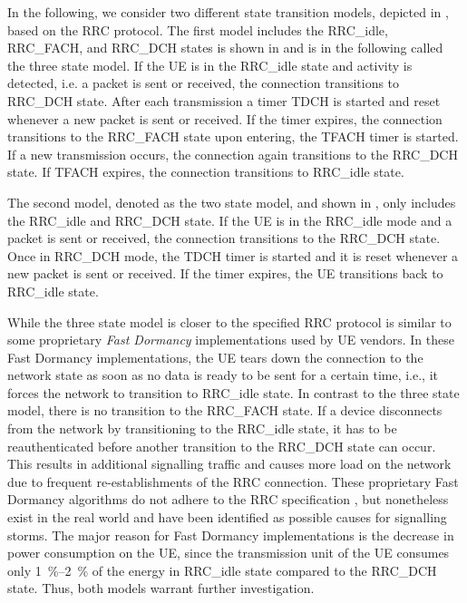 In the following, we consider two different state transition models, depicted in , based on the \gls{RRC} protocol.
The first model includes the \gls{RRC_idle}, \gls{RRC_FACH}, and \gls{RRC_DCH} states is shown in  and is in the following called the three state model.
If the \gls{UE} is in the \gls{RRC_idle} state and activity is detected, i.e. a packet is sent or received, the connection transitions to \gls{RRC_DCH} state.
After each transmission a timer \gls{TDCH} is started and reset whenever a new packet is sent or received.
If the timer expires, the connection transitions to the \gls{RRC_FACH} state upon entering, the \gls{TFACH} timer is started.
If a new transmission occurs, the connection again transitions to the \gls{RRC_DCH} state.
If \gls{TFACH} expires, the connection transitions to \gls{RRC_idle} state.

The second model, denoted as the two state model, and shown in , only includes the \gls{RRC_idle} and \gls{RRC_DCH} state.
If the \gls{UE} is in the \gls{RRC_idle} mode and a packet is sent or received, the connection transitions to the \gls{RRC_DCH} state. Once in \gls{RRC_DCH} mode, the \gls{TDCH} timer is started and it is reset whenever a new packet is sent or received.
If the timer expires, the \gls{UE} transitions back to \gls{RRC_idle} state.

While the three state model is closer to the specified \gls{RRC} protocol is similar to some proprietary \emph{Fast Dormancy} implementations used by \gls{UE} vendors.
In these Fast Dormancy implementations, the \gls{UE} tears down the connection to the network state as soon as no data is ready to be sent for a certain time, i.e., it forces the network to transition to \gls{RRC_idle} state.
In contrast to the three state model, there is no transition to the \gls{RRC_FACH} state.
If a device disconnects from the network by transitioning to the \gls{RRC_idle} state, it has to be reauthenticated before another transition to the \gls{RRC_DCH} state can occur.
This results in additional signalling traffic and causes more load on the network \cite{NSN2011} due to frequent re-establishments of the RRC connection.
These proprietary Fast Dormancy algorithms do not adhere to the \gls{RRC} specification \cite{GSM2010}, but nonetheless exist in the real world and have been identified as possible causes for signalling storms.
The major reason for Fast Dormancy implementations is the decrease in power consumption on the \gls{UE}, since the transmission unit of the \gls{UE} consumes only \SIrange{1}{2}{\percent} of the energy in \gls{RRC_idle} state compared to the \gls{RRC_DCH} state.
Thus, both models warrant further investigation.

